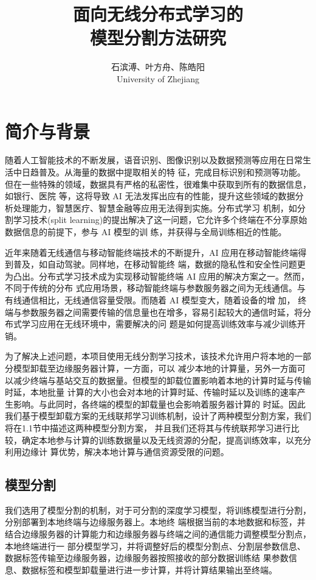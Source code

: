 \documentclass{article}
\title{面向无线分布式学习的\\模型分割方法研究} %
\author{%
\textsc{石滨溥、叶方舟、陈皓阳} \\[1ex] %
\normalsize University of Zhejiang \\ %
}
\date{} %
\begin{document}
\maketitle
\tableofcontents
\newpage
\section{简介与背景}

随着⼈⼯智能技术的不断发展，语⾳识别、图像识别以及数据预测等应⽤在⽇常⽣活中⽇趋普及。从海量的数据中提取相关的特
征，完成⽬标识别和预测等功能。但在⼀些特殊的领域，数据具有严格的私密性，很难集中获取到所有的数据信息，如银⾏、医院
等，这将导致 AI ⽆法发挥出应有的性能，提升这些领域的数据分析处理能⼒，智慧医疗、智慧⾦融等应⽤⽆法得到实施。分布式学习
机制，如分割学习技术(split learning)的提出解决了这⼀问题，它允许多个终端在不分享原始数据信息的前提下，参与 AI 模型的训
练，并获得与全局训练相近的性能。

近年来随着⽆线通信与移动智能终端技术的不断提升，AI 应⽤在移动智能终端得到普及，如⾃动驾驶。同样地，在移动智能终
端，数据的隐私性和安全性问题更为凸出。分布式学习技术成为实现移动智能终端 AI 应⽤的解决⽅案之⼀。然⽽，不同于传统的分布
式应⽤场景，移动智能终端与参数服务器之间为⽆线通信。与有线通信相⽐，⽆线通信容量受限。⽽随着 AI 模型变⼤，随着设备的增
加， 终端与参数服务器之间需要传输的信息量也在增多，容易引起较⼤的通信时延，将分布式学习应⽤在⽆线环境中，需要解决的问
题是如何提⾼训练效率与减少训练开销。

为了解决上述问题，本项⽬使⽤⽆线分割学习技术，该技术允许⽤户将本地的⼀部分模型卸载⾄边缘服务器计算，⼀⽅⾯，可以
减少本地的计算量，另外⼀⽅⾯可以减少终端与基站交互的数据量。但模型的卸载位置影响着本地的计算时延与传输时延，本地批量
计算的⼤⼩也会对本地的计算时延、传输时延以及训练的速率产⽣影响。与此同时，各终端的模型的卸载量也会影响着服务器计算的
时延。因此我们基于模型卸载⽅案的⽆线联邦学习训练机制，设计了两种模型分割⽅案，我们将在1.1节中描述这两种模型分割⽅案，
并且我们还将其与传统联邦学习进⾏⽐较，确定本地参与计算的训练数据量以及⽆线资源的分配，提⾼训练效率，以充分利⽤边缘计
算优势，解决本地计算与通信资源受限的问题。

\subsection{模型分割}
我们选⽤了模型分割的机制，对于可分割的深度学习模型，将训练模型进⾏分割，分别部署到本地终端与边缘服务器上。本地终
端根据当前的本地数据和标签，并结合边缘服务器的计算能⼒和边缘服务器与终端之间的通信能⼒调整模型分割点，本地终端进⾏⼀
部分模型学习，并将调整好后的模型分割点、分割层参数信息、数据标签传输⾄边缘服务器，边缘服务器按照接收的部分数据训练结
果参数信息、数据标签和模型卸载量进⾏进⼀步计算，并将计算结果输出⾄终端。
\end{document}
